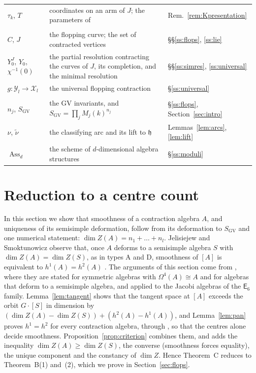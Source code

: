 \documentclass[11pt]{amsart}
\numberwithin{table}{section}
\numberwithin{figure}{section}
\numberwithin{equation}{section}
\theoremstyle{definition}
\theoremstyle{plain}
\newcommand{\cX}{\mathcal{X}}
\newcommand{\cY}{\mathcal{Y}}
\newcommand{\h}{\mathfrak{h}}
\newcommand{\SGV}{S_{\mathrm{GV}}}
\DeclareMathOperator{\Ass}{Ass}
\newcommand{\tnu}{\tilde\nu}
\begin{document}
{\begin{xltabular}{\textwidth}{@{}>{\raggedright}p{2.6cm} X l@{}}
$\tau_k$, $T$ & coordinates on an arm of $J$; the parameters of \cite{K} & Rem.~\ref{rem:Kpresentation} \\[3pt]
 \\*
$C$, $J$ & the flopping curve; the set of contracted vertices & \S\S\ref{ss:flops}, \ref{ss:lie} \\
$Y_0^J$, $Y_0$, $\chi^{-1}(0)$ & the partial resolution contracting the curves of $J$, its completion, and the minimal resolution & \S\S\ref{ss:simres}, \ref{ss:universal} \\
$g\colon \cY_l \to \cX_l$ & the universal flopping contraction & \S\ref{ss:universal} \\[3pt]
 \\*
$n_j$, $\SGV$ & the GV invariants, and $\SGV = \prod_j M_j(k)^{n_j}$ & \S\ref{ss:flops}, Section~\ref{sec:intro} \\
$\nu$, $\tnu$ & the classifying arc and its lift to $\h$ & Lemmas~\ref{lem:arcs}, \ref{lem:lift} \\
$\Ass_d$ & the scheme of $d$-dimensional algebra structures & \S\ref{ss:moduli} \\
\end{xltabular}
}

%
\section{Reduction to a centre count}\label{sec:reduction}

In this section we show that smoothness of a contraction algebra $A$, and uniqueness of its semisimple deformation, follow from its deformation to $\SGV$ and one numerical statement: $\dim Z(A) = n_1 + \dots + n_l$. Jelisiejew and Smoktunowicz observe that, once $A$ deforms to a semisimple algebra $S$ with $\dim Z(A) = \dim Z(S)$, as in types A and D, smoothness of $[A]$ is equivalent to $h^1(A) = h^2(A)$ \cite[\S1, Thm~3.7]{JS}. The arguments of this section come from \cite[Lemmas~2.8, 2.9, Prop~2.11]{Pan}, where they are stated for symmetric algebras with $\Omega^4(A) \cong A$ and for algebras that deform to a semisimple algebra, and applied to the Jacobi algebras of the $\mathsf{E}_6$ family. Lemma~\ref{lem:tangent} shows that the tangent space at $[A]$ exceeds the orbit $G\cdot[S]$ in dimension by $(\dim Z(A) - \dim Z(S)) + (h^2(A) - h^1(A))$, and Lemma~\ref{lem:pan} proves $h^1 = h^2$ for every contraction algebra, through \cite{JKM}, so that the centres alone decide smoothness. Proposition~\ref{prop:criterion} combines them, and adds the inequality $\dim Z(A) \ge \dim Z(S)$, the converse (smoothness forces equality), the unique component and the constancy of $\dim Z$. Hence Theorem~C reduces to Theorem~B(1) and~(2), which we prove in Section~\ref{sec:flops}.
\end{document}
